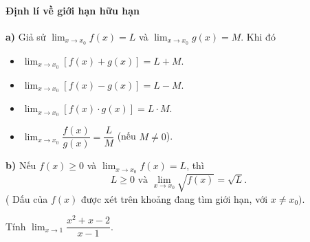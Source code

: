 \paragraph{Định lí về giới hạn hữu hạn}
\begin{dl} 
\textbf{a)} Giả sử $\displaystyle \lim_{x \to x_0}f(x) = L$ và $\displaystyle \lim_{x \to x_0}g(x) = M$. Khi đó
\begin{itemize}
\item	$\displaystyle \lim_{x \to x_0} \left[ f(x) + g(x) \right] = L + M$.
\item$\displaystyle \lim_{x \to x_0} \left[ f(x) - g(x) \right] = L - M$.
\item	$\displaystyle \lim_{x \to x_0} \left[ f(x) \cdot g(x) \right] = L \cdot M$.
\item	$\displaystyle \lim_{x \to x_0} \dfrac{f(x)}{g(x)} = \dfrac{L}{M}$ (nếu $M \neq 0$).
\end{itemize}
\textbf{b)} Nếu $f(x) \geq 0$ và $\displaystyle \lim_{x \to x_0}f(x) = L$, thì $$ L \geq 0 \text{ và }\displaystyle \lim_{x \to x_0} \sqrt{f(x)} = \sqrt{L}.$$
( Dấu của $f(x)$ được xét trên khoảng đang tìm giới hạn, với $x \neq x_0)$.
\end{dl}
\begin{vd}%
Tính $\displaystyle \lim_{x \to 1} \dfrac{x^2 + x - 2}{x - 1}$.
\end{vd}
